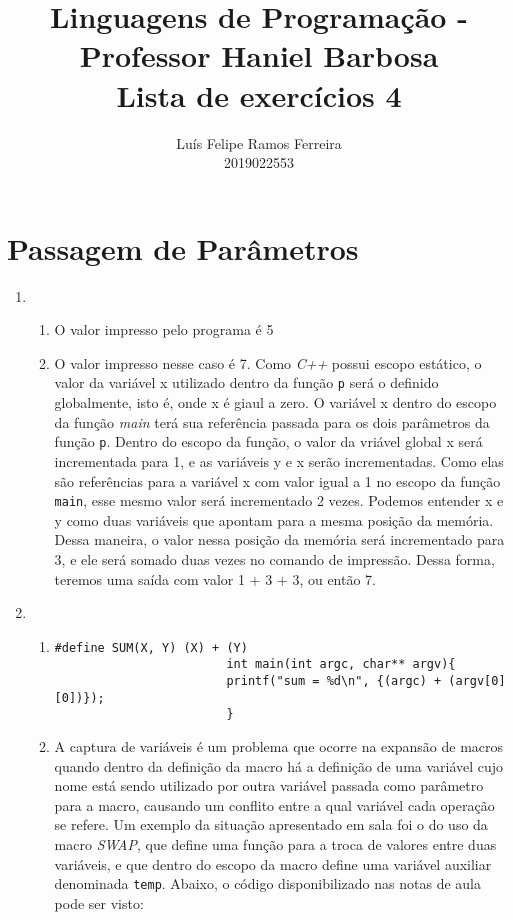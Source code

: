 \documentclass{article}
\title{Linguagens de Programação - Professor Haniel Barbosa \\ Lista de exercícios 4}
\author{Luís Felipe Ramos Ferreira \\ 2019022553}
\begin{document}
\maketitle

\section{Passagem de Parâmetros}
    \begin{enumerate}
        \item
            \begin{enumerate}[label=(\alph*)]
                \item
                    O valor impresso pelo programa é 5
                \item
                    O valor impresso nesse caso é 7. Como \textit{C++} possui escopo estático,
                    o valor da variável x utilizado dentro da função \texttt{p} será o definido globalmente, isto é,
                    onde x é giaul a zero. O variável x dentro do escopo da função \textit{main} terá sua referência
                    passada para os dois parâmetros da função \texttt{p}. Dentro do escopo da função, o valor da vriável global
                    x será incrementada para 1, e as variáveis y e x serão incrementadas. Como elas são referências para a variável x com
                    valor igual a 1 no escopo da função \texttt{main}, esse mesmo valor será incrementado 2 vezes. Podemos entender x e y
                    como duas variáveis que apontam para a mesma posição da memória. Dessa maneira, o valor nessa posição da memória será incrementado
                    para 3, e ele será somado duas vezes no comando de impressão. Dessa forma, teremos uma saída com valor 1 + 3 + 3, ou então 7.
            \end{enumerate}
        \item
            \begin{enumerate}[label=(\alph*)]
                \item
                    \begin{lstlisting}[style=CStyle]
                        #define SUM(X, Y) (X) + (Y)
                        int main(int argc, char** argv){
                        printf("sum = %d\n", {(argc) + (argv[0][0])}); 
                        }
                    \end{lstlisting}
                \item 
                    A captura de variáveis é um problema que ocorre na expansão de macros quando dentro da definição da macro há
                    a definição de uma variável cujo nome está sendo utilizado por outra variável passada como parâmetro para a macro, causando
                    um conflito entre a qual variável cada operação se refere. Um exemplo da situação apresentado em sala foi
                    o do uso da macro \textit{SWAP}, que define uma função para a troca de valores entre duas variáveis, e que dentro do escopo
                    da macro define uma variável auxiliar denominada \texttt{temp}. Abaixo, o código disponibilizado nas notas de aula
                    pode ser visto:
                    

\end{enumerate}
\end{enumerate}
\end{document}
